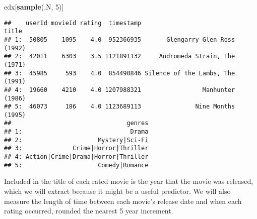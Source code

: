 \documentclass[
]{article}
\newenvironment{Shaded}{\begin{snugshade}}{\end{snugshade}}
\newcommand{\DecValTok}[1]{\textcolor[rgb]{0.00,0.00,0.81}{#1}}
\newcommand{\KeywordTok}[1]{\textcolor[rgb]{0.13,0.29,0.53}{\textbf{#1}}}
\newcommand{\NormalTok}[1]{#1}
\begin{document}
\begin{Shaded}
\begin{Highlighting}[]
\NormalTok{edx[}\KeywordTok{sample}\NormalTok{(.N, }\DecValTok{5}\NormalTok{)]}
\end{Highlighting}
\end{Shaded}

\begin{verbatim}
##    userId movieId rating  timestamp                            title
## 1:  50805    1095    4.0  952366935       Glengarry Glen Ross (1992)
## 2:  42011    6303    3.5 1121891132     Andromeda Strain, The (1971)
## 3:  45985     593    4.0  854490846 Silence of the Lambs, The (1991)
## 4:  19660    4210    4.0 1207988321                 Manhunter (1986)
## 5:  46073     186    4.0 1123689113               Nine Months (1995)
##                                genres
## 1:                              Drama
## 2:                     Mystery|Sci-Fi
## 3:              Crime|Horror|Thriller
## 4: Action|Crime|Drama|Horror|Thriller
## 5:                     Comedy|Romance
\end{verbatim}

Included in the title of each rated movie is the year that the movie was
released, which we will extract because it might be a useful predictor.
We will also measure the length of time between each movie's release
date and when each rating occurred, rounded the nearest 5 year
increment.
\end{document}
